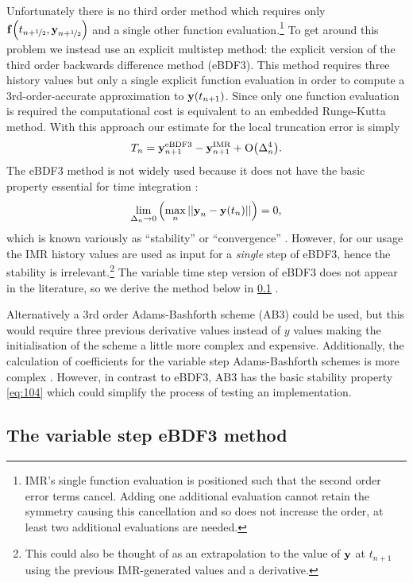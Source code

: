 Unfortunately there is no third order method which requires only ${\boldsymbol{\mathrm{f}}{\left( t_{n+\nicefrac{1}{2}}, \boldsymbol{\mathrm{y}}_{n+\nicefrac{1}{2}} \right)}}$ and a single other function evaluation.\footnote{IMR's single function evaluation is positioned such that the second order error terms cancel. Adding one additional evaluation cannot retain the symmetry causing this cancellation and so does not increase the order, at least two additional evaluations are needed.}
To get around this problem we instead use an explicit multistep method: the explicit version of the third order backwards difference method (eBDF3).
This method requires three history values but only a single explicit function evaluation in order to compute a 3rd-order-accurate approximation to $\boldsymbol{\mathrm{y}}(t_{n+1})$.
Since only one function evaluation is required the computational cost is equivalent to an embedded Runge-Kutta method.
With this approach our estimate for the local truncation error is simply
\begin{equation}
  \label{eq:aimr-lte-est}
  T_n = \boldsymbol{\mathrm{y}}_{n+1}^{\mathrm{eBDF3}} - \boldsymbol{\mathrm{y}}_{n+1}^{\mathrm{IMR}} + \mathrm{O}{\left( \Delta_{n}^4 \right)}.
\end{equation}
The eBDF3 method is not widely used because it does not have the basic property essential for time integration \cite[365]{HairerNorsettWanner}:
\begin{equation}
  \lim_{\Delta_{n} \rightarrow 0} {\left(  \max_n \left| \left| \boldsymbol{\mathrm{y}}_{n} - \boldsymbol{\mathrm{y}}(t_n) \right| \right| \right)} = 0,
  \label{eq:104}
\end{equation}
which is known variously as ``stability'' \cite[378]{HairerNorsettWanner} or ``convergence'' \cite[6]{Iserles2009}.
However, for our usage the IMR history values are used as input for a \emph{single} step of eBDF3, hence the stability is irrelevant.\footnote{This could also be thought of as an extrapolation to the value of $\boldsymbol{\mathrm{y}}$ at $t_{n+1}$ using the previous IMR-generated values and a derivative.}
The variable time step version of eBDF3 does not appear in the literature, so we derive the method below in \cref{sec:variable-step-ebdf3} .

Alternatively a 3rd order Adams-Bashforth scheme (AB3) could be used, but this would require three previous derivative values instead of $y$ values making the initialisation of the scheme a little more complex and expensive.
Additionally, the calculation of coefficients for the variable step Adams-Bashforth schemes is more complex \cite[400]{HairerNorsettWanner}.
However, in contrast to eBDF3, AB3 has the basic stability property \cref{eq:104} which could simplify the process of testing an implementation.


\subsection{The variable step eBDF3 method}
\label{sec:variable-step-ebdf3}


